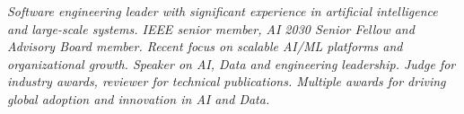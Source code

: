 {\selectfont
	\begin{justify}\textit{Software engineering leader with significant experience in artificial intelligence and large-scale systems. IEEE senior member, AI 2030 Senior Fellow and Advisory Board member. Recent focus on scalable AI/ML platforms and organizational growth. Speaker on AI, Data and engineering leadership. Judge for industry awards, reviewer for technical publications. Multiple awards for driving global adoption and innovation in AI and Data.}\end{justify}
}
\vspace{-12pt}
